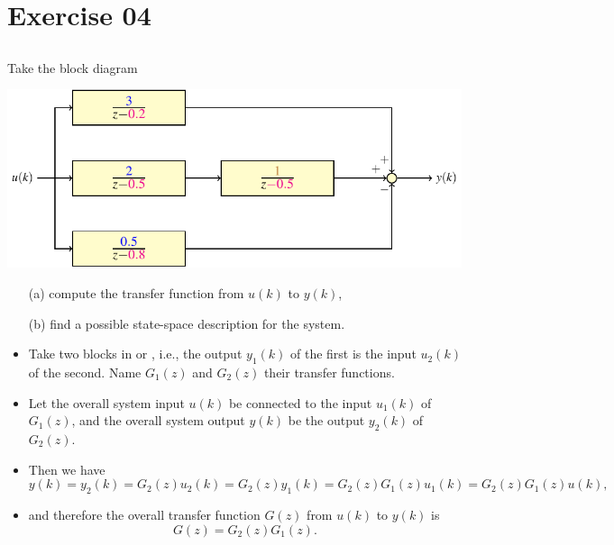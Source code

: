 \section{Exercise 04}
\subsection{}

\begin{frame}[label={pag:ex-realisation}]
\myPause
 Take the block diagram
 \begin{center}
  \includegraphics[width=0.85\columnwidth]{./Unit-03/img/PS01-ex04-fig01.pdf}
 \end{center}\myPause
 \begin{itemize}[<+-| alert@+>]
 \item[(a)] compute the transfer function from $u(k)$ to $y(k)$,
 \item[(b)] find a possible state-space description for the system.
 \end{itemize}
\end{frame}

\begin{frame}
\myPause
 \begin{itemize}[<+-| alert@+>]
 \item Take two blocks in  or , i.e., the output $y_1(k)$ of the first is the
       input $u_2(k)$ of the second. Name $G_1(z)$ and $G_2(z)$ their transfer functions.
 \item Let the overall system input $u(k)$ be connected to the input $u_1(k)$ of $G_1(z)$, and the overall
       system output $y(k)$ be the output $y_2(k)$ of $G_2(z)$.
 \item Then we have
       \begin{displaymath}
        y(k) = y_2(k) = G_2(z)u_2(k) = G_2(z)y_1(k) = G_2(z)G_1(z)u_1(k)=G_2(z)G_1(z)u(k),
       \end{displaymath}
 \item and therefore the overall transfer function $G(z)$ from $u(k)$ to $y(k)$ is
       \begin{displaymath}
        G(z) = G_2(z)G_1(z).
       \end{displaymath}
 \end{itemize}
\end{frame}

